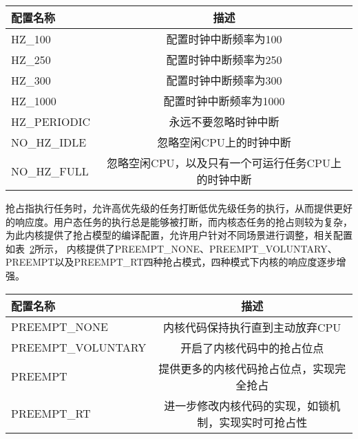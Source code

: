 \begin{table}
    \label{tab:config_hz}
    \footnotesize%
    \setlength{\tabcolsep}{4pt}%
    \renewcommand{\arraystretch}{1.5}%
    \centering
    \begin{tabular}{lc}
        \hline
        配置名称 & 描述 \\
        \hline
        HZ\_100  & 配置时钟中断频率为100  \\
        HZ\_250  & 配置时钟中断频率为250 \\
        HZ\_300  & 配置时钟中断频率为300 \\
        HZ\_1000 & 配置时钟中断频率为1000 \\
        HZ\_PERIODIC & 永远不要忽略时钟中断 \\
        NO\_HZ\_IDLE & 忽略空闲CPU上的时钟中断 \\
        NO\_HZ\_FULL & 忽略空闲CPU，以及只有一个可运行任务CPU上的时钟中断 \\
        \hline
    \end{tabular}
\end{table}

抢占指执行任务时，允许高优先级的任务打断低优先级任务的执行，从而提供更好的响应度。用户态任务的执行总是能够被打断，而内核态任务的抢占则较为复杂，为此内核提供了抢占模型的编译配置，允许用户针对不同场景进行调整，相关配置如表~\ref{tab:config_preempt}所示， 内核提供了PREEMPT\_NONE、PREEMPT\_VOLUNTARY、PREEMPT以及PREEMPT\_RT四种抢占模式，四种模式下内核的响应度逐步增强。

\begin{table}
    \label{tab:config_preempt}
    \footnotesize%
    \setlength{\tabcolsep}{4pt}%
    \renewcommand{\arraystretch}{1.5}%
    \centering
    \begin{tabular}{lc}
        \hline
        配置名称 & 描述 \\
        \hline
        PREEMPT\_NONE  & 内核代码保持执行直到主动放弃CPU  \\
        PREEMPT\_VOLUNTARY  & 开启了内核代码中的抢占位点 \\
        PREEMPT  & 提供更多的内核代码抢占位点，实现完全抢占 \\
        PREEMPT\_RT & 进一步修改内核代码的实现，如锁机制，实现实时可抢占性 \\
        \hline
    \end{tabular}
\end{table}

